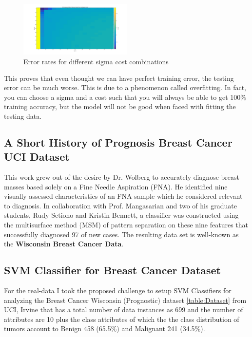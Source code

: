\documentclass[conference]{IEEEtran}
\begin{document}
\begin{figure}[bt!]
\centering
\includegraphics[width=0.5\textwidth]{figs/perf.png}
\caption{Error rates for different sigma cost combinations}
\label{fig:perf} 
\end{figure}

This proves that even thought we can have perfect training error, the testing
error can be much worse. This is due to a phenomenon called overfitting. In fact, 
you can choose a sigma and a cost such that you will always be able to get 
100\% training accuracy, but the model will not be good when faced with fitting
the testing data. 


\subsection{A Short History of Prognosis Breast Cancer UCI Dataset}
This work grew out of the desire by Dr. Wolberg to accurately diagnose breast masses based solely on a Fine Needle Aspiration (FNA). He identified nine visually assessed characteristics of an FNA sample which he considered relevant to diagnosis. In collaboration with Prof. Mangasarian and two of his graduate students, Rudy Setiono and Kristin Bennett, a classifier was constructed using the multisurface method (MSM) of pattern separation on these nine features that successfully diagnosed 97 of new cases. The resulting data set is well-known as the \textbf{ Wisconsin Breast Cancer Data}.

\subsection{SVM Classifier for Breast Cancer Dataset}
For the real-data I took the proposed challenge to setup SVM Classifiers for analyzing the Breast Cancer Wisconsin \cite{Mang1} \cite{Mang2} \cite{Mang1}(Prognostic) dataset \ref{table:Dataset} from UCI, Irvine that has a total number of data instances as 699 and the number of attributes are 10 plus the class attributes of which the the class distribution of tumors account to Benign 458 (65.5\%)  and Malignant 241 (34.5\%).
\end{document}
